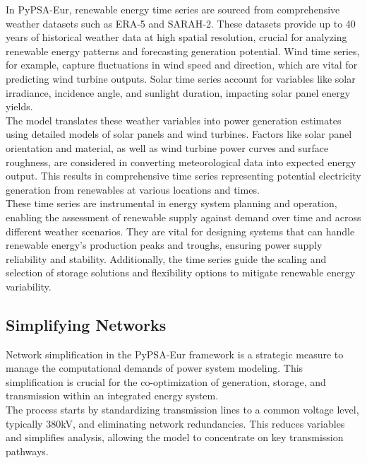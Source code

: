 In PyPSA-Eur, renewable energy time series are sourced from comprehensive weather datasets such as ERA-5 and SARAH-2. These datasets provide up to 40 years of historical weather data at high spatial resolution, crucial for analyzing renewable energy patterns and forecasting generation potential. Wind time series, for example, capture fluctuations in wind speed and direction, which are vital for predicting wind turbine outputs. Solar time series account for variables like solar irradiance, incidence angle, and sunlight duration, impacting solar panel energy yields.\\

The model translates these weather variables into power generation estimates using detailed models of solar panels and wind turbines. Factors like solar panel orientation and material, as well as wind turbine power curves and surface roughness, are considered in converting meteorological data into expected energy output. This results in comprehensive time series representing potential electricity generation from renewables at various locations and times.\\

These time series are instrumental in energy system planning and operation, enabling the assessment of renewable supply against demand over time and across different weather scenarios. They are vital for designing systems that can handle renewable energy's production peaks and troughs, ensuring power supply reliability and stability. Additionally, the time series guide the scaling and selection of storage solutions and flexibility options to mitigate renewable energy variability.\\

\subsection{Simplifying Networks}
Network simplification in the PyPSA-Eur framework is a strategic measure to manage the computational demands of power system modeling. This simplification is crucial for the co-optimization of generation, storage, and transmission within an integrated energy system.\\

The process starts by standardizing transmission lines to a common voltage level, typically 380kV, and eliminating network redundancies. This reduces variables and simplifies analysis, allowing the model to concentrate on key transmission pathways.\\

